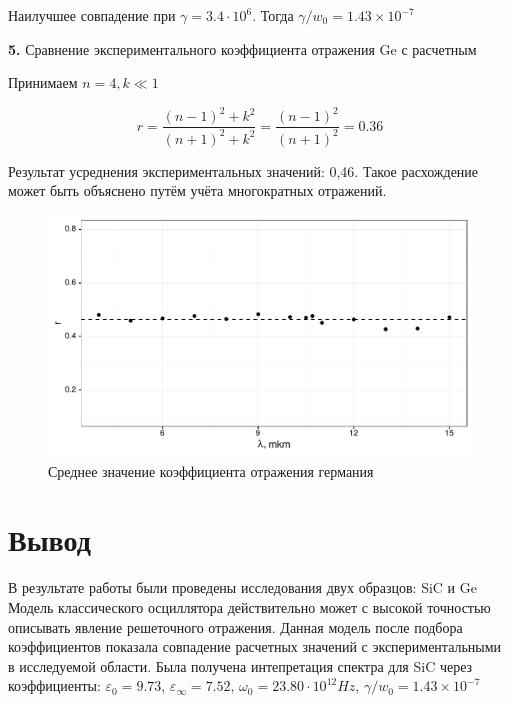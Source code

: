 \documentclass[a4paper,11pt]{report}\usepackage[]{graphicx}\usepackage[]{color}
\makeatletter
\def\maxwidth{ %
  \ifdim\Gin@nat@width>\linewidth
    \linewidth
  \else
    \Gin@nat@width
  \fi
}
\newenvironment{knitrout}{}{} %
\makeatother
\begin{document}
Наилучшее совпадение  при $\gamma = 3.4 \cdot 10^6$.  Тогда $\gamma/w_0 = \ensuremath{1.43\times 10^{-7}} $




\textbf{5.} Сравнение экспериментального коэффициента отражения Ge с расчетным

Принимаем $n=4, k \ll 1 $

$$r = \frac{(n-1)^2+k^2}{(n+1)^2+k^2} = \frac{(n-1)^2}{(n+1)^2}=0.36$$

Результат усреднения экспериментальных значений: 0,46. Такое расхождение может быть объяснено путём учёта многократных отражений.


\begin{knitrout}
\color{fgcolor}\begin{figure}[!h]
\includegraphics[width=\maxwidth]{figure/rgraph54-1} \caption[Среднее значение коэффициента отражения германия]{Среднее значение коэффициента отражения германия}\label{fig:rgraph54}
\end{figure}


\end{knitrout}

\clearpage
\section*{Вывод}

В результате работы были проведены исследования двух образцов: SiC и Ge
Модель классического осциллятора действительно может с высокой точностью описывать явление решеточного отражения. Данная модель после подбора коэффициентов показала  совпадение расчетных значений с экспериментальными в исследуемой области. Была получена интепретация спектра для SiC через коэффициенты: $\varepsilon_0 = 9.73$, $\varepsilon_{\infty} =   7.52$, $\omega_0 = 23.80 \cdot 10^{12} Hz$, $\gamma/w_0 = \ensuremath{1.43\times 10^{-7}} $
\end{document}
